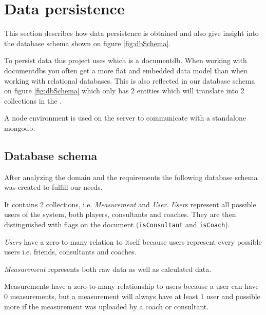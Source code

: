 \section{Data persistence}
This section describes how data persistence is obtained and also give insight into the database schema shown on figure \ref{fig:dbSchema}.

To persist data this project uses  which is a \gls{documentdb}.
When working with \glspl{documentdb} you often get a more flat and embedded data model than when working with relational databases. 
This is also reflected in our database schema on figure \ref{fig:dbSchema} which only has 2 entities which will translate into 2 collections in the .

A \gls{node} environment is used on the server to communicate with a standalone \gls{mongodb}.

\subsection{Database schema}
After analyzing the domain and the requirements the following database schema was created to fulfill our needs.

It contains 2 collections, i.e. \textit{Measurement} and \textit{User}. \textit{User}s represent all possible users of the system, both players, consultants and coaches. 
They are then distinguished with flags on the document (\verb+isConsultant+ and \verb+isCoach+).

\textit{Users} have a zero-to-many relation to itself because users represent every possible users i.e. friends, consultants and coaches.

\textit{Measurement} represents both raw data as well as calculated data.

Measurements have a zero-to-many relationship to users because a user can have 0 measurements, but a measurement will always have at least 1 user and possible more if the measurement was uploaded by a coach or consultant.

